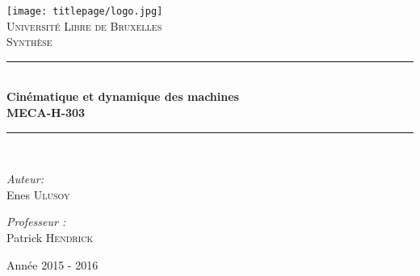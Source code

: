 \AddToShipoutPicture*{\BackgroundPic}
\begin{titlepage}
\begin{center}	
	
	\newcommand{\HRule}{\rule{\linewidth}{0.5mm}}   			            %
	\texttt{[image: titlepage/logo.jpg]}~\\[1cm]				%

	\textsc{\LARGE Université Libre de Bruxelles}\\[1.5cm]
	\textsc{\Large Synthèse}\\[0.5cm]

	\HRule \\[0.4cm]
	{ \huge \bfseries Cinématique et dynamique des machines\ \\MECA-H-303 \\[0.4cm] }


	\HRule \\[1.5cm]
	\begin{minipage}{0.6\textwidth}
	\begin{flushleft} \large
		\emph{Auteur:}\\
		Enes \textsc{Ulusoy}\\
	\end{flushleft}
	\end{minipage}
	\begin{minipage}{0.25\textwidth}
	\large
		\emph{Professeur :}\\
		Patrick \textsc{Hendrick}
	\end{minipage}

	\vfill

{\large Année 2015 - 2016}

\end{center}
\end{titlepage}